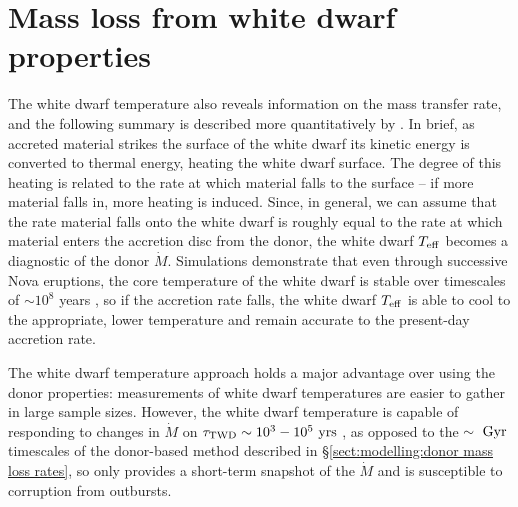 \section{Mass loss from white dwarf properties}
\label{sect:modelling:white dwarf mass loss rates}



The white dwarf temperature also reveals information on the mass transfer rate, and the following summary is described more quantitatively by \citet{townsley2009}.
In brief, as accreted material strikes the surface of the white dwarf its kinetic energy is converted to thermal energy, heating the white dwarf surface.
The degree of this heating is related to the rate at which material falls to the surface -- if more material falls in, more heating is induced.
Since, in general, we can assume that the rate material falls onto the white dwarf is roughly equal to the rate at which material enters the accretion disc from the donor, the white dwarf $T_{\rm eff}$ becomes a diagnostic of the donor $\dot M$.
Simulations demonstrate that even through successive Nova eruptions, the core temperature of the white dwarf is stable over timescales of $\sim 10^8$ years \citep{epelstain2007}, so if the accretion rate falls, the white dwarf $T_{\rm eff}$ is able to cool to the appropriate, lower temperature and remain accurate to the present-day accretion rate.

The white dwarf temperature approach holds a major advantage over using the donor properties: measurements of white dwarf temperatures are easier to gather in large sample sizes.
However, the white dwarf temperature is capable of responding to changes in $\dot M$ on $\tau_{\rm TWD} \sim 10^3 - 10^5\ {\rm yrs}$ \citep{townsley2009}, as opposed to the $\rm \sim~Gyr$ timescales of the donor-based method described in \S\ref{sect:modelling:donor mass loss rates}, so only provides a short-term snapshot of the $\dot M$ and is susceptible to corruption from outbursts.

